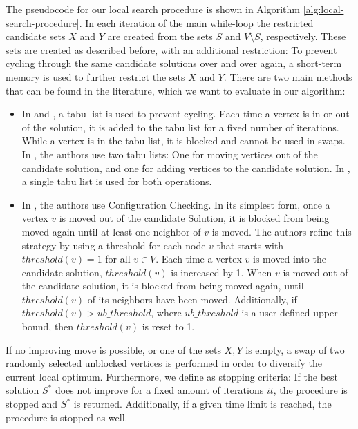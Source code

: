 \documentclass[draft,final]{vutinfth} %
\begin{document}
The pseudocode for our local search procedure is shown in Algorithm \ref{alg:local-search-procedure}. 
In each iteration of the main while-loop the restricted candidate sets $X$ and $Y$ are created from the sets $S$ and $V \setminus S$, respectively. These sets are created as described before, with an additional restriction: To prevent cycling through the same candidate solutions over and over again, a short-term memory is used to further restrict the sets $X$ and $Y$. There are two main methods that can be found in the literature, which we want to evaluate in our algorithm: 
\begin{itemize}
    \item In \cite{djeddi_extension_2019} and \cite{zhou_opposition-based_2020}, a tabu list is used to prevent cycling. Each time a vertex is in or out of the solution, it is added to the tabu list for a fixed number of iterations. While a vertex is in the tabu list, it is blocked and cannot be used in swaps. In \cite{djeddi_extension_2019}, the authors use two tabu lists: One for moving vertices out of the candidate solution, and one for adding vertices to the candidate solution. In \cite{zhou_opposition-based_2020}, a single tabu list is used for both operations. 
    \item In \cite{chen_nuqclq_2021}, the authors use Configuration Checking. In its simplest form, once a vertex $v$ is moved out of the candidate Solution, it is blocked from being moved again until at least one neighbor of $v$ is moved. The authors refine this strategy by using a threshold for each node $v$ that starts with $threshold(v) = 1$ for all $v \in V$. Each time a vertex $v$ is moved into the candidate solution, $threshold(v)$ is increased by 1. When $v$ is moved out of the candidate solution, it is blocked from being moved again, until $threshold(v)$ of its neighbors have been moved. Additionally, if $threshold(v) > ub\_threshold$, where $ub\_threshold$ is a user-defined upper bound, then $threshold(v)$ is reset to 1. 
\end{itemize}
If no improving move is possible, or one of the sets $X, Y$ is empty, a swap of two randomly selected unblocked vertices is performed in order to diversify the current local optimum. Furthermore, we define as stopping criteria: If the best solution $S^*$ does not improve for a fixed amount of iterations $it$, the procedure is stopped and $S^*$ is returned. Additionally, if a given time limit is reached, the procedure is stopped as well. 
\end{document}
